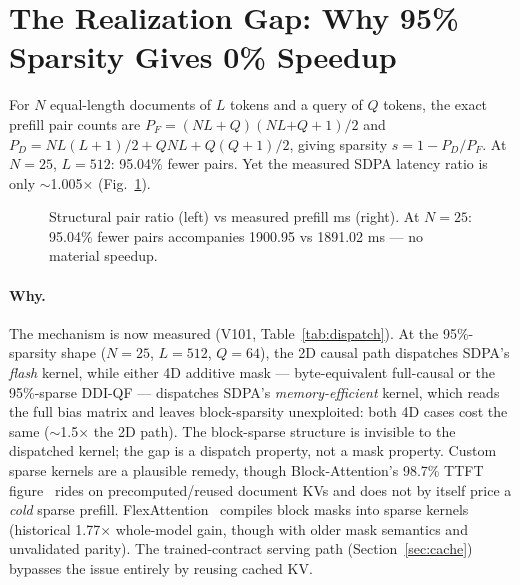 \begin{table}[H]
\centering\footnotesize
\caption{Matched quality and timing on identical requests (V57). The
isolation cost (.56/.70 vs .30/.42) and near-unity prefill ratio are
measured on the same records.}
\label{tab:v57matched}
\end{table}

\section{The Realization Gap: Why 95\% Sparsity Gives 0\% Speedup}
\label{sec:prefill}

For $N$ equal-length documents of $L$ tokens and a query of $Q$ tokens,
the exact prefill pair counts are $P_F = (NL{+}Q)(NL{{+}Q}{+}1)/2$ and
$P_D = NL(L{+}1)/2 + QNL + Q(Q{+}1)/2$, giving sparsity
$s = 1 - P_D/P_F$. At $N{=}25$, $L{=}512$: 95.04\% fewer pairs. Yet the
measured SDPA latency ratio is only $\sim$1.005$\times$ (Fig.~\ref{fig:prefill}).

\begin{figure}[H]
\centering\resizebox{.85\linewidth}{!}{}
\caption{Structural pair ratio (left) vs measured prefill ms (right). At
$N{=}25$: 95.04\% fewer pairs accompanies 1900.95 vs 1891.02 ms --- no
material speedup.}
\label{fig:prefill}
\end{figure}

\paragraph{Why.}
The mechanism is now measured (V101, Table~\ref{tab:dispatch}). At the
95\%-sparsity shape ($N{=}25$, $L{=}512$, $Q{=}64$), the 2D causal path
dispatches SDPA's \emph{flash} kernel, while either 4D additive mask ---
byte-equivalent full-causal or the 95\%-sparse DDI-QF --- dispatches SDPA's
\emph{memory-efficient} kernel, which reads the full bias matrix and leaves
block-sparsity unexploited: both 4D cases cost the same
($\sim$1.5$\times$ the 2D path). The block-sparse structure is invisible to
the dispatched kernel; the gap is a dispatch property, not a mask property.
Custom sparse kernels are a plausible remedy, though
Block-Attention's 98.7\% TTFT figure~\citep{ma2025blockattention}
rides on precomputed/reused document KVs and does not by itself price a
\emph{cold} sparse prefill. FlexAttention~\citep{flex_attention} compiles
block masks into sparse kernels
(historical 1.77$\times$ whole-model gain, though with older mask semantics
and unvalidated parity). The trained-contract serving path
(Section~\ref{sec:cache}) bypasses the issue entirely by reusing cached KV.

